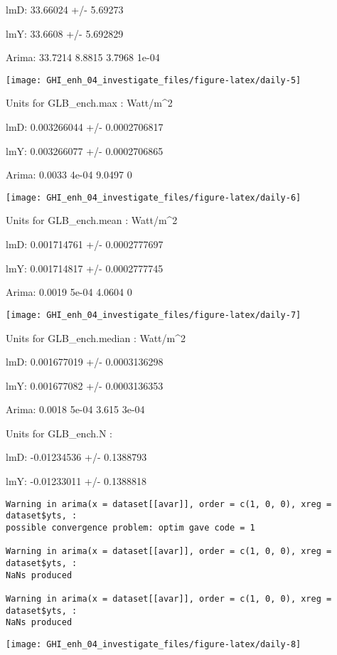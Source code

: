\documentclass[
  10pt,
  a4paper,oneside]{article}
\begin{document}
lmD: 33.66024 +/- 5.69273

lmY: 33.6608 +/- 5.692829

Arima: 33.7214 8.8815 3.7968 1e-04

\begin{center}\texttt{[image: GHI\_enh\_04\_investigate\_files/figure-latex/daily-5]} \end{center}

Units for GLB\_ench.max : Watt/m\^{}2

lmD: 0.003266044 +/- 0.0002706817

lmY: 0.003266077 +/- 0.0002706865

Arima: 0.0033 4e-04 9.0497 0

\begin{center}\texttt{[image: GHI\_enh\_04\_investigate\_files/figure-latex/daily-6]} \end{center}

Units for GLB\_ench.mean : Watt/m\^{}2

lmD: 0.001714761 +/- 0.0002777697

lmY: 0.001714817 +/- 0.0002777745

Arima: 0.0019 5e-04 4.0604 0

\begin{center}\texttt{[image: GHI\_enh\_04\_investigate\_files/figure-latex/daily-7]} \end{center}

Units for GLB\_ench.median : Watt/m\^{}2

lmD: 0.001677019 +/- 0.0003136298

lmY: 0.001677082 +/- 0.0003136353

Arima: 0.0018 5e-04 3.615 3e-04

Units for GLB\_ench.N :

lmD: -0.01234536 +/- 0.1388793

lmY: -0.01233011 +/- 0.1388818

\begin{verbatim}
Warning in arima(x = dataset[[avar]], order = c(1, 0, 0), xreg = dataset$yts, :
possible convergence problem: optim gave code = 1

Warning in arima(x = dataset[[avar]], order = c(1, 0, 0), xreg = dataset$yts, :
NaNs produced

Warning in arima(x = dataset[[avar]], order = c(1, 0, 0), xreg = dataset$yts, :
NaNs produced
\end{verbatim}

\begin{center}\texttt{[image: GHI\_enh\_04\_investigate\_files/figure-latex/daily-8]} \end{center}
\end{document}
